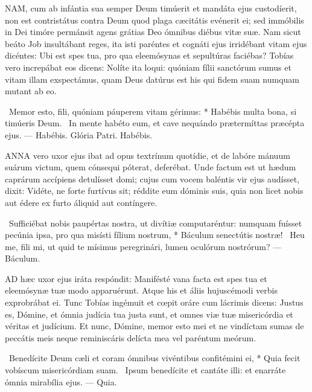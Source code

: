 

\lettrine[lines=2]{N}{AM}, cum ab infántia sua semper Deum timúerit et mandáta ejus custodíerit, non est contristátus contra Deum quod plaga cæcitátis evénerit ei; sed immóbilis in Dei timóre permánsit agens grátias Deo ómnibus diébus vitæ suæ. Nam sicut beáto Job insultábant reges, ita isti paréntes et cognáti ejus irridébant vitam ejus dicéntes: Ubi est spes tua, pro qua eleemósynas et sepultúras faciébas? Tobías vero increpábat eos dicens: Nolíte ita loqui: quóniam fílii sanctórum sumus et vitam illam exspectámus, quam Deus datúrus est his qui fidem suam numquam mutant ab eo.

\R\ Memor esto, fili, quóniam páuperem vitam gérimus: * Habébis multa bona, si timúeris Deum. \V\ In mente habéto eum, et cave nequándo prætermíttas præcépta ejus. — Habébis. Glória Patri. Habébis.




\lettrine[lines=2]{A}{NNA} vero uxor ejus ibat ad opus textrínum quotídie, et de labóre mánuum suárum victum, quem cónsequi póterat, deferébat. Unde factum est ut hædum caprárum accípiens detulísset domi; cujus cum vocem baléntis vir ejus audísset, dixit: Vidéte, ne forte furtívus sit; réddite eum dóminis suis, quia non licet nobis aut édere ex furto áliquid aut contíngere.

\R\ Sufficiébat nobis paupértas nostra, ut divítiæ computaréntur: numquam fuísset pecúnia ipsa, pro qua misísti fílium nostrum, * Báculum senectútis nostræ! \V\ Heu me, fili mi, ut quid te mísimus peregrinári, lumen oculórum nostrórum? — Báculum.


\lettrine[lines=2]{A}{D} hæc uxor ejus iráta respóndit: Manifésté vana facta est spes tua et eleemósynæ tuæ modo apparuérunt. Atque his et áliis hujuscémodi verbis exprobrábat ei. Tunc Tobías ingémuit et cœpit oráre cum lácrimis dicens: Justus es, Dómine, et ómnia judícia tua justa sunt, et omnes viæ tuæ misericórdia et véritas et judícium. Et nunc, Dómine, memor esto mei et ne vindíctam sumas de peccátis meis neque reminiscáris delícta mea vel paréntum meórum.

\R\ Benedícite Deum cæli et coram ómnibus vivéntibus confitémini ei, * Quia fecit vobíscum misericórdiam suam. \V\ Ipsum benedícite et cantáte illi: et enarráte ómnia mirabília ejus. — Quia.

